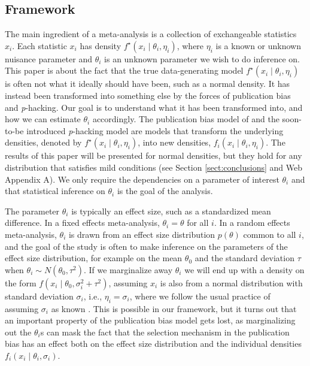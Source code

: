 \documentclass[useAMS,usenatbib,referee]{biom}
\begin{document}
\subsection{Framework}
The main ingredient of a meta-analysis is a collection of exchangeable statistics $x_{i}$. Each statistic $x_{i}$ has density $f^{\star}(x_{i}\mid\theta_{i},\eta_{i})$, where $\eta_i$ is a known or unknown nuisance parameter and $\theta_{i}$ is an unknown parameter we wish to do inference on. This paper is about the fact that the true data-generating model $f^{\star}(x_{i}\mid\theta_{i},\eta_{i})$ is often not what it ideally should have been, such as a normal density. It has instead been transformed into something else by the forces of publication bias and \textit{p}-hacking. Our goal is to understand what it has been transformed into, and how we can estimate $\theta_{i}$ accordingly. The publication bias model of \citet{hedges1992modeling,iyengar1988selection} and the soon-to-be introduced \textit{p}-hacking model are models that transform the underlying densities, denoted by $f^{\star}(x_{i}\mid\theta_{i},\eta_{i})$, into new densities, $f_{i}(x_{i}\mid\theta_{i},\eta_{i})$. The results of this paper will be presented for normal densities, but they hold for any distribution that satisfies mild conditions (see Section \ref{sect:conclusions} and Web Appendix A). We only require the dependencies on a parameter of interest $\theta_{i}$ and that statistical inference on $\theta_{i}$ is the goal of the analysis.

The parameter $\theta_{i}$ is typically an effect size, such as a standardized mean difference. In a fixed effects meta-analysis, $\theta_{i}=\theta$ for all $i$. In a random effects meta-analysis, $\theta_{i}$ is drawn from an effect size distribution $p(\theta)$ common to all $i$, and the goal of the study is often to make inference on the parameters of the effect size distribution, for example on the mean $\theta_{0}$ and the standard deviation $\tau$ when $\theta_i \sim N(\theta_{0},\tau^2)$. If we marginalize away $\theta_{i}$ we will end up with a density on the form $f(x_{i}\mid \theta_{0},\sigma_{i}^{2}+\tau^{2})$, assuming $x_{i}$ is also from a normal distribution with standard deviation $\sigma_{i}$, i.e., $\eta_i = \sigma_i$, where we follow the usual practice of assuming $\sigma_i$ as known \citep{vanHouwelingen2002}. This is possible in our framework, but it turns out that an important property of the publication bias model gets lost, as marginalizing out the $\theta_{i}$s can mask the fact that the selection mechanism in the publication bias has an effect both on the effect size distribution and the individual densities $f_{i}(x_{i}\mid\theta_i, \sigma_i)$.
\end{document}
